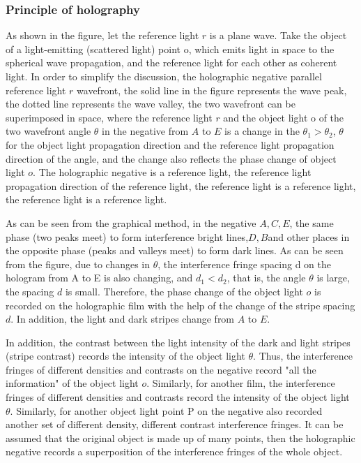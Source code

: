 \documentclass[UTF8]{article}
\begin{document}
    \subsubsection{Principle of holography}
    As shown in the figure, let the reference light $r$ is a plane wave. Take the object of a light-emitting (scattered light) point o, which emits light in space to the spherical wave propagation, and the reference light for each other as coherent light. In order to simplify the discussion, the holographic negative parallel reference light $r$ wavefront, the solid line in the figure represents the wave peak, the dotted line represents the wave valley, the two wavefront can be superimposed in space, where the reference light $r$ and the object light o of the two wavefront angle $\theta$ in the negative from $A$ to $E$ is a change in the $\theta_1> \theta_2$, $\theta$ for the object light propagation direction and the reference light propagation direction of the angle, and the change also reflects the phase change of object light $o$. The holographic negative is a reference light, the reference light propagation direction of the reference light, the reference light is a reference light, the reference light is a reference light.
    
    As can be seen from the graphical method, in the negative $A, C, E$, the same phase (two peaks meet) to form interference bright lines,$ D, B $and other places in the opposite phase (peaks and valleys meet) to form dark lines. As can be seen from the figure, due to changes in $\theta$, the interference fringe spacing d on the hologram from A to E is also changing, and $d_1 < d_2$, that is, the angle $\theta$ is large, the spacing $d$ is small. Therefore, the phase change of the object light $o$ is recorded on the holographic film with the help of the change of the stripe spacing $d$. In addition, the light and dark stripes change from $A$ to $E$.
    
    In addition, the contrast between the light intensity of the dark and light stripes (stripe contrast) records the intensity of the object light $\theta$. Thus, the interference fringes of different densities and contrasts on the negative record "all the information" of the object light $o$. Similarly, for another film, the interference fringes of different densities and contrasts record the intensity of the object light $\theta$. Similarly, for another object light point P on the negative also recorded another set of different density, different contrast interference fringes. It can be assumed that the original object is made up of many points, then the holographic negative records a superposition of the interference fringes of the whole object.
    
\end{document}
